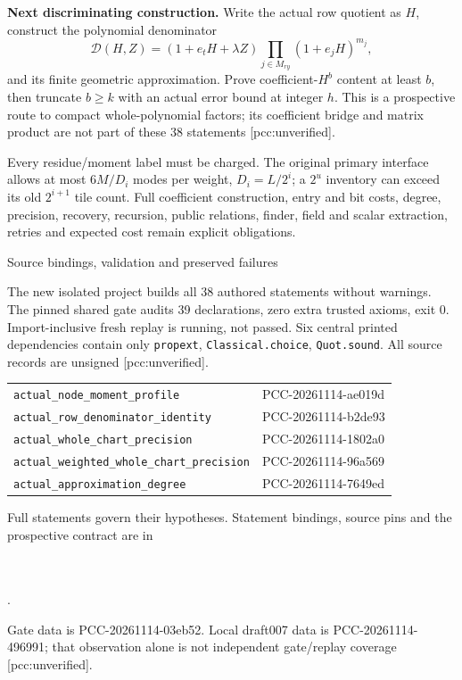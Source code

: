 \documentclass[10pt]{article}
\begin{document}
\textbf{Next discriminating construction.} Write the actual row quotient as
$H$, construct the polynomial denominator
\[
 \mathcal D(H,Z)=(1+e_tH+\lambda Z)
       \prod_{j\in M_{ry}}(1+e_jH)^{m_j},
\]
and its finite geometric approximation. Prove coefficient-$H^b$ content
at least $b$, then truncate $b\ge k$ with an actual error bound at integer
$h$. This is a prospective route to compact whole-polynomial factors; its
coefficient bridge and matrix product are not part of these 38 statements
[pcc:unverified].

Every residue/moment label must be charged. The original primary interface
allows at most $6M/D_i$ modes per weight, $D_i=L/2^i$; a $2^u$ inventory
can exceed its old $2^{i+1}$ tile count. Full coefficient construction,
entry and bit costs, degree, precision, recovery, recursion, public relations,
finder, field and scalar extraction, retries and expected cost remain
explicit obligations.

\newpage
\begin{center}{\Large Source bindings, validation and preserved failures}\end{center}
The new isolated project builds all 38 authored statements without warnings.
The pinned shared gate audits 39 declarations, zero extra trusted axioms,
exit 0. Import-inclusive fresh replay is running, not passed. Six central printed dependencies
contain only \texttt{propext}, \texttt{Classical.choice}, \texttt{Quot.sound}.
All source records are unsigned [pcc:unverified].

\begin{center}\small
\begin{tabular}{p{.64\linewidth}p{.25\linewidth}}
\texttt{actual\_node\_moment\_profile}&PCC-20261114-ae019d\\
\texttt{actual\_row\_denominator\_identity}&PCC-20261114-b2de93\\
\texttt{actual\_whole\_chart\_precision}&PCC-20261114-1802a0\\
\texttt{actual\_weighted\_whole\_chart\_precision}&PCC-20261114-96a569\\
\texttt{actual\_approximation\_degree}&PCC-20261114-7649ed
\end{tabular}
\end{center}
Full statements govern their hypotheses. Statement bindings, source pins
and the prospective contract are in
\begin{center}\small
{}\\
\\
.
\end{center}
Gate data is PCC-20261114-03eb52. Local draft007 data is PCC-20261114-496991;
that observation alone is not independent gate/replay coverage
[pcc:unverified].
\end{document}
